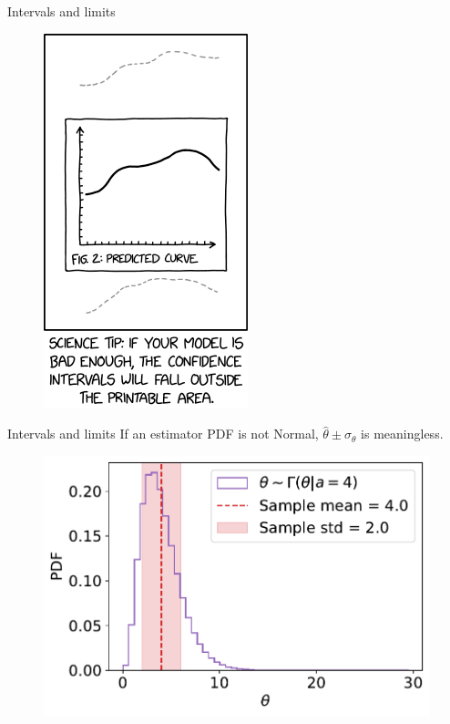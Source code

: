 \documentclass[
aspectratio=169,
14pt,
professionalfonts
]{beamer}
\begin{document}
\begin{frame}{Intervals and limits}
\begin{figure}
    \centering
    \includegraphics[width=0.25\linewidth]{../plots/confidence_interval.png}
\end{figure}
\end{frame}

\begin{frame}{Intervals and limits}
If an estimator PDF is not Normal, $\hat \theta \pm \sigma_\theta$ is meaningless.

\begin{figure}
    \centering
    \includegraphics[width=0.6\linewidth]{../plots/gamma.pdf}
\end{figure}
    
\end{frame}
\end{document}
